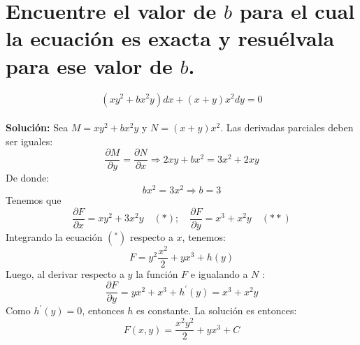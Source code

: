 \section{Encuentre el valor de $b$ para el cual la ecuación es exacta y resuélvala para ese valor de $b$.}

\begin{equation*}
    (x y^{2}+b x^{2}y) dx +(x+y) x^{2} dy= 0
\end{equation*}\\

\textbf{Solución:} Sea $M=x y^{2}+b x^{2} y$ y $N=(x+y) x^{2}$. Las derivadas parciales deben ser iguales:
$$
\frac{\partial M}{\partial y}=\frac{\partial N}{\partial x} \Rightarrow 2 x y+b x^{2}=3 x^{2}+2 x y
$$
De donde:
$$
b x^{2}=3 x^{2} \Rightarrow b=3
$$
Tenemos que
$$
\frac{\partial F}{\partial x}=x y^{2}+3 x^{2} y \quad(*) ; \quad \frac{\partial F}{\partial y}=x^{3}+x^{2} y \quad(* *)
$$
Integrando la ecuación $\left({ }^{*}\right)$ respecto a $x$, tenemos:
$$
F=y^{2} \frac{x^{2}}{2}+y x^{3}+h(y)
$$
Luego, al derivar respecto a $y$ la función $F$ e igualando a $N$ :
$$
\frac{\partial F}{\partial y}=y x^{2}+x^{3}+h^{\prime}(y)=x^{3}+x^{2} y
$$
Como $h^{\prime}(y)=0$, entonces $h$ es constante. La solución es entonces:
$$
F(x, y)=\frac{x^{2} y^{2}}{2}+y x^{3}+C
$$